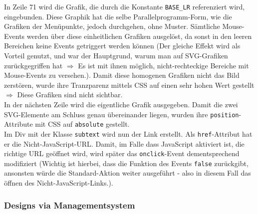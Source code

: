 In Zeile 71 wird die Grafik, die durch die Konstante \texttt{BASE\_LR} referenziert wird, eingebunden. Diese Graphik hat die selbe Parallelprogramm-Form, wie die Grafiken der Menüpunkte, jedoch durchgehen, ohne Muster. Sämtliche Mouse-Events werden über diese einheitlichen Grafiken ausgelöst, da sonst in den leeren Bereichen keine Events getriggert werden können (Der gleiche Effekt wird als Vorteil genutzt, und war der Hauptgrund, warum man auf SVG-Grafiken zurückgegriffen hat $ \Longrightarrow $ Es ist mit ihnen möglich, nicht-rechteckige Bereiche mit Mouse-Events zu versehen.). Damit diese homogenen Grafiken nicht das Bild zerstören, wurde ihre Tranzparenz mittels CSS auf einen sehr hohen Wert gestellt $ \Longrightarrow $ Diese Grafiken sind nicht sichtbar.\\
In der nächsten Zeile wird die eigentliche Grafik ausgegeben. Damit die zwei SVG-Elemente am Schluss genau übereinander liegen, wurden ihre \texttt{position}-Attribute mit CSS auf \texttt{absolute} gestellt.\\
Im Div mit der Klasse \texttt{subtext} wird nun der Link erstellt. Als \texttt{href}-Attribut hat er die Nicht-JavaScript-URL. Damit, im Falle dass JavaScript aktiviert ist, die richtige URL geöffnet wird, wird später das \texttt{onclick}-Event dementsprechend modifiziert (Wichtig ist hierbei, dass die Funktion des Events \texttt{false} zurückgibt, ansonsten würde die Standard-Aktion weiter ausgeführt - also in diesem Fall das öffnen des Nicht-JavaScript-Links.). 

\subsubsection{Designs via Managementsystem}
